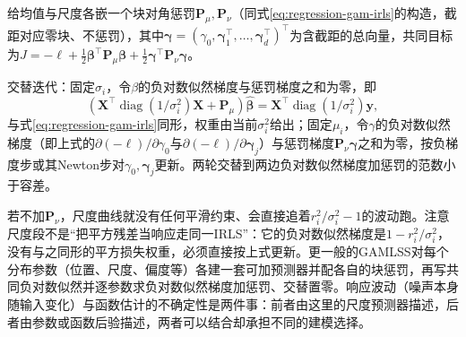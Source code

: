 给均值与尺度各嵌一个块对角惩罚$\bm{P}_\mu,\bm{P}_\nu$（同式\eqref{eq:regression-gam-irls}的构造，截距对应零块、不惩罚），其中$\bm{\gamma}=(\gamma_0,\bm{\gamma}_1^{\top},\ldots,\bm{\gamma}_d^{\top})^{\top}$为含截距的总向量，共同目标为$J=-\ell+\frac12\bm{\beta}^{\top}\bm{P}_\mu\bm{\beta}+\frac12\bm{\gamma}^{\top}\bm{P}_\nu\bm{\gamma}$。

交替迭代：固定$\sigma_i$，令$\beta$的负对数似然梯度与惩罚梯度之和为零，即
\[
  (\bm{X}^{\top}\operatorname{diag}(1/\sigma_i^2)\bm{X}+\bm{P}_\mu)\widehat{\bm{\beta}}
  =\bm{X}^{\top}\operatorname{diag}(1/\sigma_i^2)\bm{y},
\]
与式\eqref{eq:regression-gam-irls}同形，权重由当前$\sigma_i^2$给出；固定$\mu_i$，令$\gamma$的负对数似然梯度（即上式的$\partial(-\ell)/\partial\gamma_0$与$\partial(-\ell)/\partial\bm{\gamma}_j$）与惩罚梯度$\bm{P}_\nu\bm{\gamma}$之和为零，按负梯度步或其Newton步对$\gamma_0,\bm{\gamma}_j$更新。两轮交替到两边负对数似然梯度加惩罚的范数小于容差。

若不加$\bm{P}_\nu$，尺度曲线就没有任何平滑约束、会直接追着$r_i^2/\sigma_i^2-1$的波动跑。注意尺度段不是“把平方残差当响应走同一IRLS”：它的负对数似然梯度是$1-r_i^2/\sigma_i^2$，没有与之同形的平方损失权重，必须直接按上式更新。更一般的GAMLSS对每个分布参数（位置、尺度、偏度等）各建一套可加预测器并配各自的块惩罚，再写共同负对数似然并逐参数求负对数似然梯度加惩罚、交替置零。响应波动（噪声本身随输入变化）与函数估计的不确定性是两件事：前者由这里的尺度预测器描述，后者由参数或函数后验描述，两者可以结合却承担不同的建模选择。
